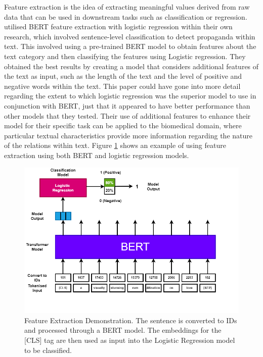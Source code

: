 \documentclass{l4proj}
\begin{document}
Feature extraction is the idea of extracting meaningful values derived from raw data that can be used in downstream tasks such as classification or regression. \cite{logreg} utilised BERT feature extraction with logistic regression within their own research, which involved sentence-level classification to detect propaganda within text. This involved using a pre-trained BERT model to obtain features about the text category and then classifying the features using Logistic regression. They obtained the best results by creating a model that considers additional features of the text as input, such as the length of the text and the level of positive and negative words within the text. This paper could have gone into more detail regarding the extent to which logistic regression was the superior model to use in conjunction with BERT, just that it appeared to have better performance than other models that they tested. Their use of additional features to enhance their model for their specific task can be applied to the biomedical domain, where particular textual characteristics provide more information regarding the nature of the relations within text. Figure \ref{fig:Feature} shows an example of using feature extraction using both BERT and logistic regression models.

\begin{figure}[htb]
    \centering
    \includegraphics[width=14cm]{images/Feature.png}
  \caption{Feature Extraction Demonstration. The sentence is converted to IDs and processed through a BERT model. The embeddings for the [CLS] tag are then used as input into the Logistic Regression model to be classified.}
  \label{fig:Feature}
\end{figure}
\end{document}
